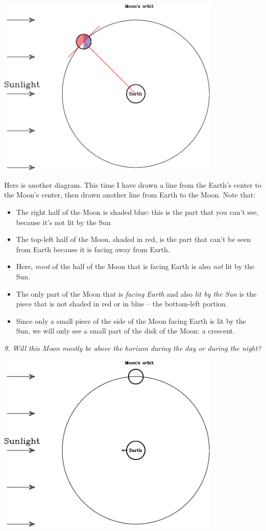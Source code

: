 \documentclass[11pt]{article}
\begin{document}
\includegraphics[width=0.8\textwidth]{moon-diagram-crescent-crop.pdf}

Here is another diagram. This time I have drawn a line from the Earth's center to the Moon's center, then drawn another line from Earth to the Moon. Note that:

\begin{itemize}
	\item The right half of the Moon is shaded blue: this is the part that you can't see, because it's not lit by the Sun
	\item The top-left half of the Moon, shaded in red, is the part that can't be seen from Earth because it is facing away from Earth.
	\item Here, {\it most} of the half of the Moon that is facing Earth is also {\it not} lit by the Sun.
	\item The only part of the Moon that is {\it facing Earth} and also {\it lit by the Sun} is the piece that is not shaded in red or in blue -- the bottom-left portion.
	\item Since only a small piece of the side of the Moon facing Earth is lit by the Sun, we will only see a small part of the disk of the Moon: a crescent.
\end{itemize}

{\it 9. Will this Moon mostly be above the horizon during the day or during the night?}

\newpage
\includegraphics[width=0.8\textwidth]{moon-diagram-half-crop.pdf}
\end{document}
